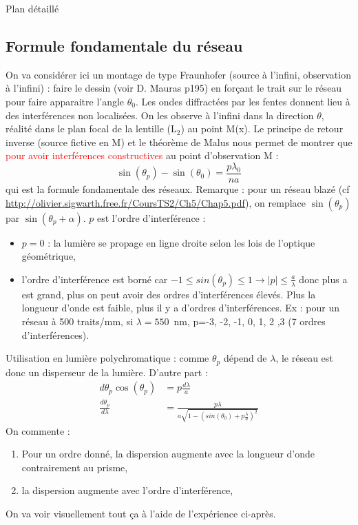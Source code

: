 \begin{reportBlock}{Plan détaillé}
  \subsection{Formule fondamentale du réseau}
  On va considérer ici un montage de type Fraunhofer (source à l'infini, observation à l'infini) : faire le dessin (voir D. Mauras p195) en forçant le trait sur le réseau pour faire apparaitre l'angle $\theta_0$. Les ondes diffractées par les fentes donnent lieu à des interférences non localisées. On les observe à l'infini dans la direction $\theta$, réalité dans le plan focal de la lentille (L$_2$) au point M(x). Le principe de retour inverse (source fictive en M) et le théorème de Malus nous permet de montrer que \textcolor{red}{pour avoir interférences constructives} au point d'observation M :
  \begin{equation}
      \sin\left(\theta_p\right) - \sin\left(\theta_0\right) = \frac{p\lambda_0}{na}
  \end{equation}
  qui est la formule fondamentale des réseaux. Remarque : pour un réseau blazé (cf \url{http://olivier.sigwarth.free.fr/CoursTS2/Ch5/Chap5.pdf}), on remplace $\sin(\theta_p)$ par $\sin(\theta_p+\alpha)$. $p$ est l'ordre d'interférence :
  \begin{itemize}
      \item $p=0$ : la lumière se propage en ligne droite selon les lois de l'optique géométrique,
      \item l'ordre d'interférence est borné car $-1\leq sin(\theta_p)\leq 1 \rightarrow |p|\leq \frac{a}{\lambda}$ donc plus a est grand, plus on peut avoir des ordres d'interférences élevés. Plus la longueur d'onde est faible, plus il y a d'ordres d'interférences. Ex : pour un réseau à 500 traits/mm, si $\lambda=550$~nm, p=-3, -2, -1, 0, 1, 2 ,3 (7 ordres d'interférences).
  \end{itemize}
  Utilisation en lumière polychromatique : comme $\theta_p$ dépend de $\lambda$, le réseau est donc un disperseur de la lumière. D'autre part :
  \begin{align*}
      d\theta_p\cos(\theta_p) &= p\frac{d\lambda}{a} \\
      \frac{d\theta_p}{d\lambda} &= \frac{p\lambda}{a\sqrt{1-(sin(\theta_0)+p\frac{\lambda}{a})^2}}
  \end{align*}
  On commente :
  \begin{enumerate}
      \item Pour un ordre donné, la dispersion augmente avec la longueur d'onde contrairement au prisme,
      \item la dispersion augmente avec l'ordre d'interférence,
  \end{enumerate}
  On va voir visuellement tout ça à l'aide de l'expérience ci-après.
  

\end{reportBlock}
